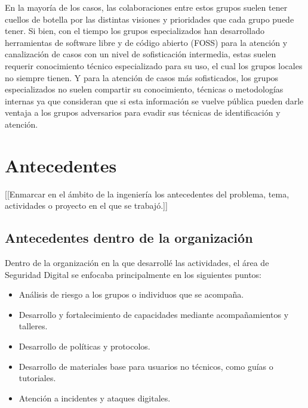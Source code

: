 \documentclass[12pt]{caltech_thesis}
\begin{document}
En la mayoría de los casos, las colaboraciones entre estos grupos suelen tener cuellos de botella  por las distintas visiones y prioridades que cada grupo puede tener. Si bien, con el tiempo los grupos especializados han desarrollado herramientas de software libre  y de código abierto  (FOSS)  para la atención y canalización de casos con un nivel de sofisticación intermedia, estas suelen requerir conocimiento técnico especializado para su uso, el cual los grupos locales no siempre tienen. Y para la atención de casos más sofisticados, los grupos especializados no suelen compartir su conocimiento, técnicas o metodologías internas ya que consideran que si esta información se vuelve pública pueden darle ventaja a los grupos adversarios para evadir sus técnicas de identificación y atención.


\chapter{Antecedentes}

[[Enmarcar en el ámbito de la ingeniería los antecedentes del problema, tema, actividades o proyecto en el que se trabajó.]]

\section{Antecedentes dentro de la organización}

Dentro de la organización en la que desarrollé las actividades, el área de Seguridad Digital se enfocaba principalmente en los siguientes puntos:

\begin{itemize}
    \item Análisis de riesgo a los grupos o individuos que se acompaña.
    \item Desarrollo y fortalecimiento de capacidades mediante acompañamientos y talleres.
    \item Desarrollo de políticas y protocolos.
    \item Desarrollo de materiales base para usuarios no técnicos, como guías o tutoriales.
    \item Atención a incidentes y ataques digitales.
\end{itemize}
\end{document}

